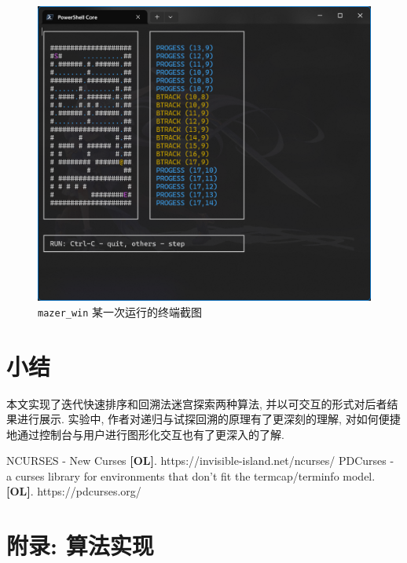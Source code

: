 \documentclass[a4paper]{article}
\begin{document}
\begin{figure}[H]
    \centering
    \includegraphics[scale=0.4]{screenshot_mazerwin_v010}
    \caption{\texttt{mazer\_win} 某一次运行的终端截图}
    \label{fig_screenshot_mazerwin}
\end{figure}

\section{小结}

本文实现了迭代快速排序和回溯法迷宫探索两种算法, 并以可交互的形式对后者结果进行展示.  实验中, 作者对递归与试探回溯的原理有了更深刻的理解, 对如何便捷地通过控制台与用户进行图形化交互也有了更深入的了解.

\begin{thebibliography}{}

 NCURSES - New Curses \textbf{[OL]}. https://invisible-island.net/ncurses/
 PDCurses - a curses library for environments that don't fit the termcap/terminfo model. \textbf{[OL]}. https://pdcurses.org/

\end{thebibliography}

\appendix

\section{附录: 算法实现}
\end{document}
